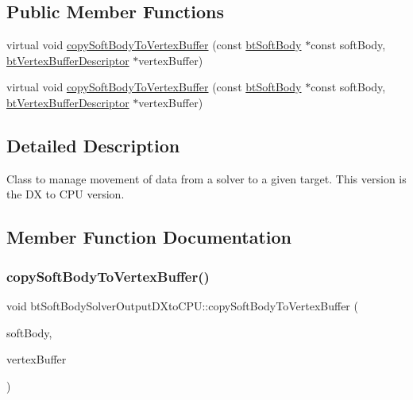 \subsection*{Public Member Functions}
\begin{DoxyCompactItemize}
\item 
virtual void \hyperlink{classbtSoftBodySolverOutputDXtoCPU_a0106bf90eec43326254607cab4a10478}{copy\+Soft\+Body\+To\+Vertex\+Buffer} (const \hyperlink{classbtSoftBody}{bt\+Soft\+Body} $\ast$const soft\+Body, \hyperlink{classbtVertexBufferDescriptor}{bt\+Vertex\+Buffer\+Descriptor} $\ast$vertex\+Buffer)
\item 
virtual void \hyperlink{classbtSoftBodySolverOutputDXtoCPU_abd837007ef454a8363e73ced3abf1f09}{copy\+Soft\+Body\+To\+Vertex\+Buffer} (const \hyperlink{classbtSoftBody}{bt\+Soft\+Body} $\ast$const soft\+Body, \hyperlink{classbtVertexBufferDescriptor}{bt\+Vertex\+Buffer\+Descriptor} $\ast$vertex\+Buffer)
\end{DoxyCompactItemize}


\subsection{Detailed Description}
Class to manage movement of data from a solver to a given target. This version is the DX to C\+PU version. 

\subsection{Member Function Documentation}
\mbox{\label{classbtSoftBodySolverOutputDXtoCPU_a0106bf90eec43326254607cab4a10478}} 
\subsubsection{\texorpdfstring{copy\+Soft\+Body\+To\+Vertex\+Buffer()}{copySoftBodyToVertexBuffer()}\hspace{0.1cm}{\footnotesize\ttfamily [1/2]}}
{\footnotesize\ttfamily void bt\+Soft\+Body\+Solver\+Output\+D\+Xto\+C\+P\+U\+::copy\+Soft\+Body\+To\+Vertex\+Buffer (\begin{DoxyParamCaption}\item[{const \hyperlink{classbtSoftBody}{bt\+Soft\+Body} $\ast$const}]{soft\+Body,  }\item[{\hyperlink{classbtVertexBufferDescriptor}{bt\+Vertex\+Buffer\+Descriptor} $\ast$}]{vertex\+Buffer }\end{DoxyParamCaption})\hspace{0.3cm}{\ttfamily [virtual]}}

